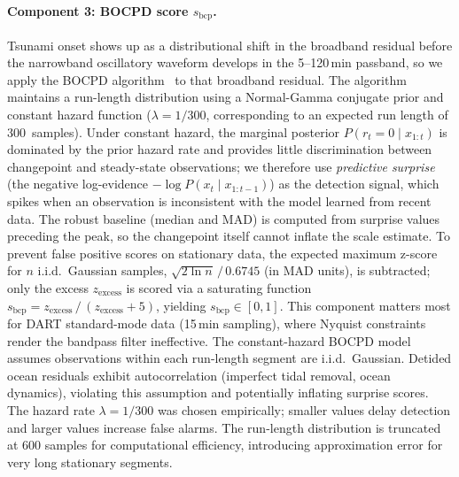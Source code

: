 \documentclass{article}
\begin{document}
\paragraph{Component 3: BOCPD score $s_\text{bcp}$.}
Tsunami onset shows up as a distributional shift in the broadband
residual before the narrowband oscillatory waveform develops in the
5--120\,min passband, so we apply the BOCPD
algorithm~\citep{adams2007bayesian} to that broadband residual.
The algorithm maintains a run-length distribution using a
Normal-Gamma conjugate prior and constant hazard function
($\lambda = 1/300$, corresponding to an expected run length of
300~samples).
Under constant hazard, the marginal posterior $P(r_t{=}0
\mid x_{1:t})$ is dominated by the prior hazard rate and provides
little discrimination between changepoint and steady-state
observations; we therefore use \emph{predictive surprise} (the
negative log-evidence $-\log P(x_t \mid x_{1:t-1})$) as the
detection signal, which spikes when an observation is inconsistent
with the model learned from recent data.  The robust baseline
(median and MAD) is computed from surprise values preceding the peak,
so the changepoint itself cannot inflate the scale estimate.
To prevent false positive scores on stationary data, the expected maximum
z-score for $n$ i.i.d.\ Gaussian samples,
$\sqrt{2\ln n}\,/\,0.6745$ (in MAD units), is subtracted; only the
excess $z_\text{excess}$ is scored via a saturating function
$s_\text{bcp} = z_\text{excess}\,/\,(z_\text{excess} + 5)$,
yielding $s_\text{bcp} \in [0,1]$.  This component matters most for DART
standard-mode data (15\,min sampling), where Nyquist constraints
render the bandpass filter ineffective.
The constant-hazard BOCPD model assumes observations within each
run-length segment are i.i.d.\ Gaussian.  Detided ocean residuals
exhibit autocorrelation (imperfect tidal removal, ocean dynamics),
violating this assumption and potentially inflating surprise scores.
The hazard rate $\lambda = 1/300$ was chosen empirically; smaller
values delay detection and larger values increase false alarms.
The run-length distribution is truncated at 600 samples for
computational efficiency, introducing approximation error for very
long stationary segments.
\end{document}
